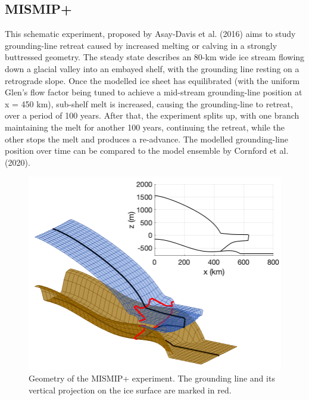 \documentclass{article}
\begin{document}
\subsection{MISMIP+}

This schematic experiment, proposed by Asay-Davis et al. (2016) aims to study grounding-line retreat caused by increased melting or calving in a strongly buttressed geometry. The steady state describes an 80-km wide ice stream flowing down a glacial valley into an embayed shelf, with the grounding line resting on a retrograde slope. Once the modelled ice sheet has equilibrated (with the uniform Glen's flow factor being tuned to achieve a mid-stream grounding-line position at x = 450 km), sub-shelf melt is increased, causing the grounding-line to retreat, over a period of 100 years. After that, the experiment splits up, with one branch maintaining the melt for another 100 years, continuing the retreat, while the other stops the melt and produces a re-advance. The modelled grounding-line position over time can be compared to the model ensemble by Cornford et al. (2020).

\begin{figure}[H]
  \includegraphics[width=0.6\linewidth]{Fig_benchmark_MISMIPplus_geometry.png}
  \caption{Geometry of the MISMIP+ experiment. The grounding line and its vertical projection on the ice surface are marked in red.}
\end{figure}
\end{document}

